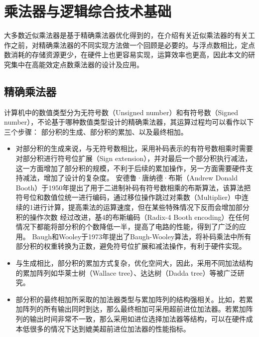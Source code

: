 \chapter{乘法器与逻辑综合技术基础}

大多数近似乘法器是基于精确乘法器优化得到的，在介绍有关近似乘法器的有关工作之前，对精确乘法器的不同实现方法做一个回顾是必要的。与浮点数相比，定点数消耗的存储资源更少，在硬件上也更容易实现，运算效率也更高，因此本文的研究集中在高能效定点数乘法器的设计及应用。

\section{精确乘法器} \label{精确乘法器}

计算机中的数值类型分为无符号数（Unsigned number）和有符号数（Signed number），不论基于哪种数值类型设计的精确乘法器，其运算过程均可以看作以下三个步骤： 部分积的生成、部分积的累加、以及最终相加。%
\begin{itemize}
    \item 对部分积的生成来说，与无符号数相比，采用补码表示的有符号数相乘时需要对部分积进行符号位扩展（Sign extension），并对最后一个部分积执行减法，这一方面增加了部分积的规模，不利于后续的累加操作，另一方面需要硬件支持减法，增加了设计的复杂度。
    安德鲁·唐纳德·布斯（Andrew Donald Booth）于1950年提出了用于二进制补码有符号数相乘的布斯算法\cite{EM:booth_orig}，该算法把符号位和数值位统一进行编码，通过移位操作跳过对乘数（Multiplier）中连续的1进行计算，提高乘法的运算速度，但在某些特殊情况下反而会增加部分积的操作次数%
    经过改进，基4的布斯编码（Radix-4 Booth encoding）在任何情况下都能将部分积的个数降低一半\cite{EM:booth_Macsorley,EM:booth_proof}，提高了电路的性能，得到了广泛的应用。
    Baugh和Wooley于1973年提出了Baugh-Wooley算法\cite{EM:baugh-wooley}，将补码乘法中所有部分积的权重转换为正数，避免符号位扩展和减法操作，有利于硬件实现。

    \item 与生成相比，部分积的累加方式复杂，优化空间大，因此，采用不同加法结构的累加阵列如华莱士树（Wallace tree）\cite{EM:Wallace}、达达树（Dadda tree）\cite{EM:Dadda}等被广泛研究。
   
    \item 部分积的最终相加所采取的加法器类型与累加阵列的结构强相关。比如，若累加阵列的所有输出同时到达，那么最终相加可采用超前进位加法器。若累加阵列的输出时间非常不一致，那么采用如进位选择加法器等结构，可以在硬件成本低很多的情况下达到媲美超前进位加法器的性能指标\cite{数字集成电路_第十一章_设计运算功能块}。
\end{itemize}


